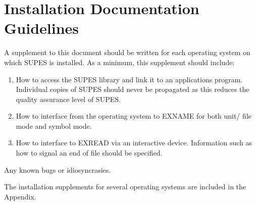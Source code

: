 \section{Installation Documentation Guidelines}
A supplement to this document should be written for each operating system on
which SUPES is installed.  As a minimum, this supplement should include:
\begin{enumerate}
\item How to access the SUPES library and link it to an applications
        program.  Individual copies of SUPES should never be propagated as
        this reduces the quality assurance level of SUPES.

\item How to interface from the operating system to EXNAME for both unit/
        file mode and symbol mode.

\item How to interface to EXREAD via an interactive device.  Information
        such as how to signal an end of file should be specified.
\end{enumerate}

Any known bugs or idiosyncrasies.

The installation supplements for several operating systems are included in
the Appendix.
